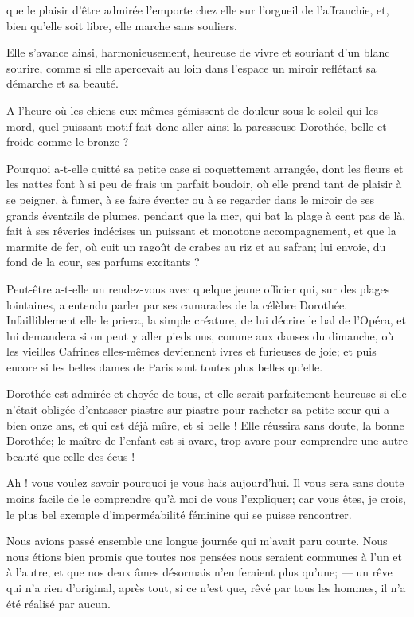 \quebra

\noindent{}que le plaisir d’être
admirée l’emporte chez elle sur
l’orgueil de l’affranchie, et, bien
qu’elle soit libre, elle marche sans souliers.

Elle s’avance ainsi, harmonieusement, heureuse de vivre
et souriant d’un blanc sourire, comme si elle
apercevait au loin dans l’espace un miroir reflétant
sa démarche et sa beauté.

A l’heure où les chiens eux{}-mêmes gémissent de
douleur sous le soleil qui les mord, quel puissant motif fait donc
aller ainsi la paresseuse Dorothée, belle et froide comme le bronze ?

Pourquoi a{}-t{}-elle quitté sa petite case si coquettement arrangée,
dont les fleurs et les nattes font à si peu de frais un parfait
boudoir, où elle prend tant de plaisir à se peigner, à fumer, à se
faire éventer ou à se regarder dans le miroir de ses grands éventails
de plumes, pendant que la mer, qui bat la plage à cent pas de là, fait
à ses rêveries indécises un puissant et monotone accompagnement, et que
la marmite de fer, où cuit un ragoût de crabes au riz et au safran; lui
envoie, du fond de la cour, ses parfums excitants ?

Peut{}-être a{}-t{}-elle un rendez{}-vous avec quelque jeune officier
qui, sur des plages lointaines, a entendu parler par ses camarades de
la célèbre Dorothée. Infailliblement elle le priera, la simple
créature, de lui décrire le bal de l’Opéra, et lui
demandera si on peut y aller pieds nus, comme aux danses du dimanche,
où les vieilles Cafrines elles{}-mêmes deviennent ivres et furieuses de
joie; et puis encore si les belles dames de Paris sont toutes plus
belles qu’elle.

Dorothée est admirée et choyée de tous, et elle serait parfaitement
heureuse si elle n’était obligée
d’entasser piastre sur piastre pour racheter sa petite
s\oe ur qui a bien onze ans, et qui est déjà mûre, et si belle ! Elle
réussira sans doute, la bonne Dorothée; le maître de
l’enfant est si avare, trop avare pour comprendre une
autre beauté que celle des écus !


Ah ! vous voulez savoir pourquoi je vous hais
aujourd’hui. Il vous sera sans doute moins facile de
le comprendre qu’à moi de vous
l’expliquer; car vous êtes, je crois, le plus bel
exemple d’imperméabilité féminine qui se puisse
rencontrer.

Nous avions passé ensemble une longue journée qui
m’avait paru courte. Nous nous étions bien promis que
toutes nos pensées nous seraient communes à l’un et à
l’autre, et que nos deux âmes désormais
n’en feraient plus qu’une; --- un rêve
qui n’a rien d’original, après tout,
si ce n’est que, rêvé par tous les hommes, il
n’a été réalisé par aucun.

